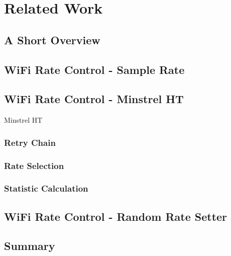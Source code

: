 
\chapter{Related Work}
\label{chap:related_work}

\section{A Short Overview}
\label{s:basics}


\section{WiFi Rate Control - Sample Rate}
\section{WiFi Rate Control - Minstrel HT}




Minstrel HT \cite{MinstrelHT}
\subsection{Retry Chain}


\subsection{Rate Selection}


\subsection{Statistic Calculation}



\label{s:single_control}
\section{WiFi Rate Control - Random Rate Setter}

\section{Summary}


